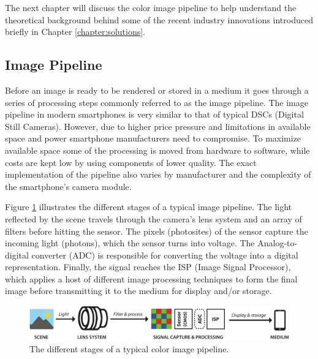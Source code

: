 \documentclass[thesis.tex]{subfiles}
\begin{document}
The next chapter will discuss the color image pipeline to help understand the theoretical background behind some of the recent industry innovations introduced briefly in Chapter \ref{chapter:solutions}.

\subsection{Image Pipeline}
Before an image is ready to be rendered or stored in a medium it goes through a series of processing steps commonly referred to as the image pipeline. The image pipeline in modern smartphones is very similar to that of typical DSCs (Digital Still Cameras). However, due to higher price pressure and limitations in available space and power smartphone manufacturers need to compromise. To maximize available space some of the processing is moved from hardware to software, while costs are kept low by using components of lower quality. The exact implementation of the pipeline also varies by manufacturer and the complexity of the smartphone's camera module.

Figure \ref{figure:pipeline} illustrates the different stages of a typical image pipeline. The light reflected by the scene travels through the camera's lens system and an array of filters before hitting the sensor. The pixels (photosites) of the sensor capture the incoming light (photons), which the sensor turns into voltage. The Analog-to-digital converter (ADC) is responsible for converting the voltage into a digital representation. Finally, the signal reaches the ISP (Image Signal Processor), which applies a host of different image processing techniques to form the final image before transmitting it to the medium for display and/or storage.

\begin{figure}[ht]
\centering \includegraphics[width=\textwidth]{images/pipeline}
\caption{The different stages of a typical color image pipeline.\label{figure:pipeline}}
\end{figure}
\end{document}
